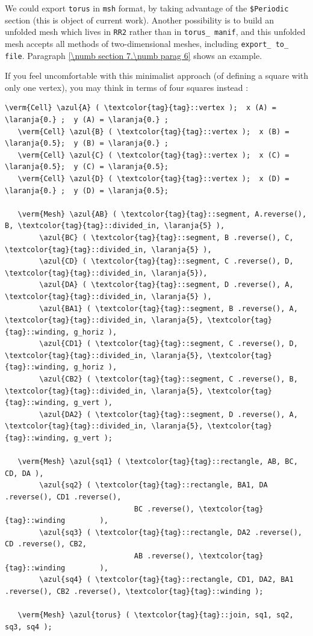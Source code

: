 We could export {\small\tt torus} in {\small\tt msh} format, by taking advantage of the
{\small\tt \$Periodic} section (this is object of current work).
Another possibility is to build an unfolded mesh which lives in {\small\tt RR2} rather than in
{\small\tt torus\_\,manif}, and this unfolded mesh accepts all methods of two-dimensional
meshes, including {\small\tt export\_\,to\_\,file}.
Paragraph \ref{\numb section 7.\numb parag 6} shows an example.

If you feel uncomfortable with this minimalist approach (of defining a square with only one vertex), 
you may think in terms of four squares instead :

\begin{Verbatim}[commandchars=\\\{\},formatcom=\small\tt,
   baselinestretch=0.94,framesep=2mm                      ]
   \verm{Cell} \azul{A} ( \textcolor{tag}{tag}::vertex );  x (A) = \laranja{0.} ;  y (A) = \laranja{0.} ;
   \verm{Cell} \azul{B} ( \textcolor{tag}{tag}::vertex );  x (B) = \laranja{0.5};  y (B) = \laranja{0.} ;
   \verm{Cell} \azul{C} ( \textcolor{tag}{tag}::vertex );  x (C) = \laranja{0.5};  y (C) = \laranja{0.5};
   \verm{Cell} \azul{D} ( \textcolor{tag}{tag}::vertex );  x (D) = \laranja{0.} ;  y (D) = \laranja{0.5};

   \verm{Mesh} \azul{AB} ( \textcolor{tag}{tag}::segment, A.reverse(), B, \textcolor{tag}{tag}::divided_in, \laranja{5} ),
        \azul{BC} ( \textcolor{tag}{tag}::segment, B .reverse(), C, \textcolor{tag}{tag}::divided_in, \laranja{5} ),
        \azul{CD} ( \textcolor{tag}{tag}::segment, C .reverse(), D, \textcolor{tag}{tag}::divided_in, \laranja{5}),
        \azul{DA} ( \textcolor{tag}{tag}::segment, D .reverse(), A, \textcolor{tag}{tag}::divided_in, \laranja{5} ),
        \azul{BA1} ( \textcolor{tag}{tag}::segment, B .reverse(), A, \textcolor{tag}{tag}::divided_in, \laranja{5}, \textcolor{tag}{tag}::winding, g_horiz ),
        \azul{CD1} ( \textcolor{tag}{tag}::segment, C .reverse(), D, \textcolor{tag}{tag}::divided_in, \laranja{5}, \textcolor{tag}{tag}::winding, g_horiz ),
        \azul{CB2} ( \textcolor{tag}{tag}::segment, C .reverse(), B, \textcolor{tag}{tag}::divided_in, \laranja{5}, \textcolor{tag}{tag}::winding, g_vert ),
        \azul{DA2} ( \textcolor{tag}{tag}::segment, D .reverse(), A, \textcolor{tag}{tag}::divided_in, \laranja{5}, \textcolor{tag}{tag}::winding, g_vert );

   \verm{Mesh} \azul{sq1} ( \textcolor{tag}{tag}::rectangle, AB, BC, CD, DA ),
        \azul{sq2} ( \textcolor{tag}{tag}::rectangle, BA1, DA .reverse(), CD1 .reverse(),
                              BC .reverse(), \textcolor{tag}{tag}::winding        ),
        \azul{sq3} ( \textcolor{tag}{tag}::rectangle, DA2 .reverse(), CD .reverse(), CB2,
                              AB .reverse(), \textcolor{tag}{tag}::winding        ),
        \azul{sq4} ( \textcolor{tag}{tag}::rectangle, CD1, DA2, BA1 .reverse(), CB2 .reverse(), \textcolor{tag}{tag}::winding );
	
   \verm{Mesh} \azul{torus} ( \textcolor{tag}{tag}::join, sq1, sq2, sq3, sq4 );
\end{Verbatim}

